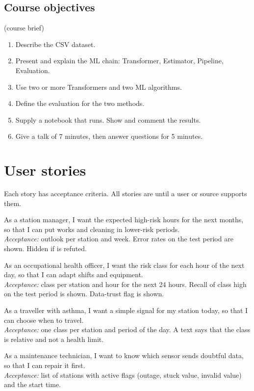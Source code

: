 \documentclass[11pt]{article}
\begin{document}
\subsection{Course objectives} \tSource{} (course brief)
\begin{enumerate}
  \item Describe the CSV dataset.
  \item Present and explain the ML chain: Transformer, Estimator, Pipeline, Evaluation.
  \item Use two or more Transformers and two ML algorithms.
  \item Define the evaluation for the two methods.
  \item Supply a notebook that runs. Show and comment the results.
  \item Give a talk of 7 minutes, then answer questions for 5 minutes.
\end{enumerate}

\section{User stories}
Each story has acceptance criteria. All stories are \tAssumed{} until a user or source supports them.

\begin{description}[style=nextline,leftmargin=1.5em,font=\sffamily\bfseries]
  \item[US-1 Station manager] As a station manager, I want the expected high-risk hours for the next months, so that I can put works and cleaning in lower-risk periods.\\
  \emph{Acceptance:} outlook per station and week. Error rates on the test period are shown. Hidden if  is refuted.
  \item[US-2 Occupational health] As an occupational health officer, I want the risk class for each hour of the next day, so that I can adapt shifts and equipment.\\
  \emph{Acceptance:} class per station and hour for the next 24 hours. Recall of class high on the test period is shown. Data-trust flag is shown.
  \item[US-3 Sensitive traveller] As a traveller with asthma, I want a simple signal for my station today, so that I can choose when to travel.\\
  \emph{Acceptance:} one class per station and period of the day. A text says that the class is relative and not a health limit.
  \item[US-4 Sensor maintenance] As a maintenance technician, I want to know which sensor sends doubtful data, so that I can repair it first.\\
  \emph{Acceptance:} list of stations with active flags (outage, stuck value, invalid value) and the start time.
\end{description}
\end{document}
